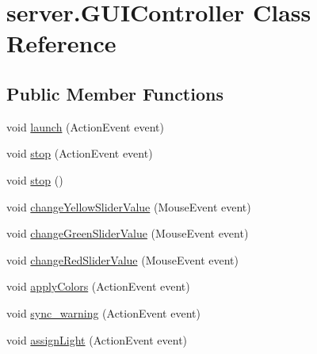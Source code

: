 \hypertarget{classserver_1_1_g_u_i_controller}{}\section{server.\+G\+U\+I\+Controller Class Reference}
\label{classserver_1_1_g_u_i_controller}
\subsection*{Public Member Functions}
\begin{DoxyCompactItemize}
\item 
void \hyperlink{classserver_1_1_g_u_i_controller_acf92ca1ea088749ae09c2b0af80aa1bb}{launch} (Action\+Event event)
\item 
void \hyperlink{classserver_1_1_g_u_i_controller_aa9937074dfbc56bff950e32b50839830}{stop} (Action\+Event event)
\item 
void \hyperlink{classserver_1_1_g_u_i_controller_aae8010b06b7b15549184c337bf52143d}{stop} ()
\item 
void \hyperlink{classserver_1_1_g_u_i_controller_a5d4f06a9637212f2997fac0c4e2170af}{change\+Yellow\+Slider\+Value} (Mouse\+Event event)
\item 
void \hyperlink{classserver_1_1_g_u_i_controller_adf1f5bc21fa366cef67190136b77592d}{change\+Green\+Slider\+Value} (Mouse\+Event event)
\item 
void \hyperlink{classserver_1_1_g_u_i_controller_addab5196eb4594616a3bd2dcc29489db}{change\+Red\+Slider\+Value} (Mouse\+Event event)
\item 
void \hyperlink{classserver_1_1_g_u_i_controller_a6bacbc209aafa62be4804ff3856376e3}{apply\+Colors} (Action\+Event event)
\item 
void \hyperlink{classserver_1_1_g_u_i_controller_a8cd1634fc294643ea4b9521e8208fe47}{sync\+\_\+warning} (Action\+Event event)
\item 
void \hyperlink{classserver_1_1_g_u_i_controller_ae1193dc919447002f2b789250150ca5f}{assign\+Light} (Action\+Event event)
\end{DoxyCompactItemize}
